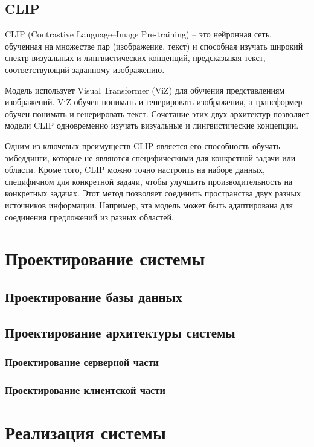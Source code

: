 \documentclass[PI, VKR]{HSEUniversity}
\begin{document}
\section{CLIP}
\label{sec:orga2d73b5}
CLIP (Contrastive Language–Image Pre-training)\autocite{radford2021learning} -- это нейронная сеть, обученная на множестве пар (изображение, текст) и способная изучать широкий спектр визуальных и лингвистических концепций, предсказывая текст, соответствующий заданному изображению.

Модель использует Visual Transformer (ViZ) \autocite{dosovitskiy2020image} для обучения представлениям изображений. ViZ обучен понимать и генерировать изображения, а трансформер\autocite{NIPS2017_3f5ee243} обучен понимать и генерировать текст. Сочетание этих двух архитектур позволяет модели CLIP одновременно изучать визуальные и лингвистические концепции.

Одним из ключевых преимуществ CLIP является его способность обучать эмбеддинги, которые не являются специфическими для конкретной задачи или области. Кроме того, CLIP можно точно настроить на наборе данных, специфичном для конкретной задачи, чтобы улучшить производительность на конкретных задачах. Этот метод позволяет соединить пространства двух разных источников информации. Например, эта модель может быть адаптирована для соединения предложений из разных областей.
\chapter{Проектирование системы}
\label{sec:org304a460}
\section{Проектирование базы данных}
\label{sec:orgc2334b2}

\section{Проектирование архитектуры системы}
\label{sec:orgb4f09d7}
\subsection{Проектирование серверной части}
\label{sec:orgca80a85}
\subsection{Проектирование клиентской части}
\label{sec:orga7a0768}

\chapter{Реализация системы}
\label{sec:org4a0e83b}
\end{document}
